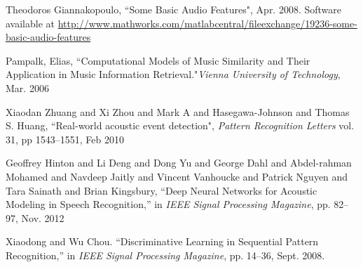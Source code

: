 \documentclass{article}
\begin{document}
\begin{sloppy}
\begin{thebibliography}{8}
 Theodoros Giannakopoulo, ``Some Basic Audio Features", Apr. 2008. Software available at \url{http://www.mathworks.com/matlabcentral/fileexchange/19236-some-basic-audio-features}

Pampalk, Elias, ``Computational Models of Music Similarity and Their Application in Music Information Retrieval."\emph{Vienna University of Technology}, Mar. 2006

Xiaodan Zhuang and Xi Zhou and Mark A and Hasegawa-Johnson and Thomas S. Huang, ``Real-world acoustic event detection", \emph{Pattern Recognition Letters} vol. 31, pp 1543--1551, Feb 2010

Geoffrey Hinton and Li Deng and Dong Yu and George Dahl and Abdel-rahman Mohamed and Navdeep Jaitly and Vincent Vanhoucke and Patrick Nguyen and Tara Sainath and Brian Kingsbury,  ``Deep Neural Networks for Acoustic Modeling in Speech Recognition,'' in \emph{IEEE Signal Processing Magazine}, pp. 82--97, Nov. 2012
 
Xiaodong and Wu Chou. ``Discriminative Learning in Sequential Pattern Recognition,''  in \emph{IEEE Signal Processing Magazine}, pp. 14--36, Sept. 2008.
 
 \end{thebibliography}


\end{sloppy}
\end{document}
